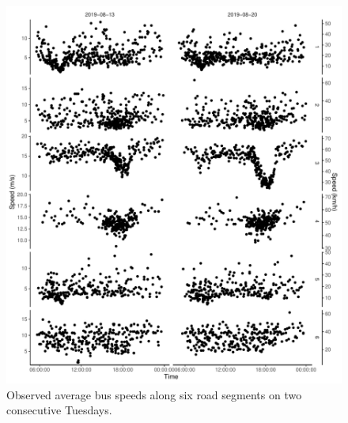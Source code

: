 \begin{knitrout}\small
{}\color{fgcolor}\begin{figure}

{\centering \includegraphics[width=\textwidth]{figure/nw_model_n2_segplots-1} 

}

\caption[Observed average bus speeds along six road segments on two consecutive Tuesdays]{Observed average bus speeds along six road segments on two consecutive Tuesdays.}\label{fig:nw_model_n2_segplots}
\end{figure}


\end{knitrout}

